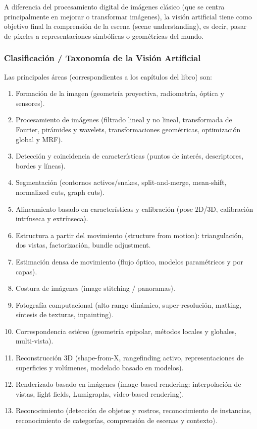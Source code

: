 A diferencia del procesamiento digital de imágenes clásico (que se centra principalmente en mejorar o transformar imágenes), la visión artificial tiene como objetivo final la comprensión de la escena (scene understanding), es decir, pasar de píxeles a representaciones simbólicas o geométricas del mundo.

\subsubsection{Clasificación / Taxonomía de la Visión Artificial}

Las principales áreas (correspondientes a los capítulos del libro) son:
\begin{enumerate}
	\item Formación de la imagen (geometría proyectiva, radiometría, óptica y sensores).
	\item Procesamiento de imágenes (filtrado lineal y no lineal, transformada de Fourier, pirámides y wavelets, transformaciones geométricas, optimización global y MRF).
	\item Detección y coincidencia de características (puntos de interés, descriptores, bordes y líneas).
	\item Segmentación (contornos activos/snakes, split-and-merge, mean-shift, normalized cuts, graph cuts).
	\item Alineamiento basado en características y calibración (pose 2D/3D, calibración intrínseca y extrínseca).
	\item Estructura a partir del movimiento (structure from motion): triangulación, dos vistas, factorización, bundle adjustment.
	\item Estimación densa de movimiento (flujo óptico, modelos paramétricos y por capas).
	\item Costura de imágenes (image stitching / panoramas).
	\item Fotografía computacional (alto rango dinámico, super-resolución, matting, síntesis de texturas, inpainting).
	\item Correspondencia estéreo (geometría epipolar, métodos locales y globales, multi-vista).
	\item Reconstrucción 3D (shape-from-X, rangefinding activo, representaciones de superficies y volúmenes, modelado basado en modelos).
	\item Renderizado basado en imágenes (image-based rendering: interpolación de vistas, light fields, Lumigraphs, video-based rendering).
	\item Reconocimiento (detección de objetos y rostros, reconocimiento de instancias, reconocimiento de categorías, comprensión de escenas y contexto).
\end{enumerate}

